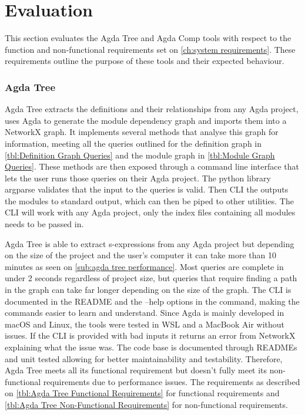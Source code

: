 
\chapter{Evaluation}

This section evaluates the Agda Tree and Agda Comp tools with respect to the
function and non-functional requirements set on \cref{ch:system
requirements}. These requirements outline the purpose of these tools and their
expected behaviour.

\subsection{Agda Tree} \label{sub:eval agda tree}

Agda Tree extracts the definitions and their relationships from any Agda
project, uses Agda to generate the module dependency graph and imports them
into a NetworkX graph. It implements several methods that analyse this
graph for information, meeting all the queries outlined for the definition
graph in \cref{tbl:Definition Graph Queries} and the module graph in 
\cref{tbl:Module Graph Queries}. These methods are then exposed through a
command line interface that lets the user runs those queries on their Agda
project. The python library argparse validates that the input to the queries is
valid. Then CLI the outputs the modules to standard output, which can then be
piped to other utilities. The CLI will work with any Agda project, only the
index files containing all modules needs to be passed in. 

Agda Tree is able to extract s-expressions from any Agda project but depending
on the size of the project and the user's computer it can take more than 10
minutes as seen on \cref{sub:agda tree performance}. Most queries are
complete in under 2 seconds regardless of project size, but queries that
require finding a path in the graph can take far longer depending on the size
of the graph. The CLI is documented in the README and the \textsf{--help}
options in the command, making the commands easier to learn and understand.
Since Agda is mainly developed in macOS and Linux, the tools were tested in WSL
and a MacBook Air without issues. If the CLI is provided with bad inputs it
returns an error from NetworkX explaining what the issue was. The code base is
documented through READMEs and unit tested allowing for better maintainability
and testability. Therefore, Agda Tree meets all its functional requirement but
doesn't fully meet its non-functional requirements due to performance issues.
The requirements as described on \cref{tbl:Agda Tree Functional Requirements} for functional requirements and 
\cref{tbl:Agda Tree Non-Functional Requirements} for non-functional requirements.

